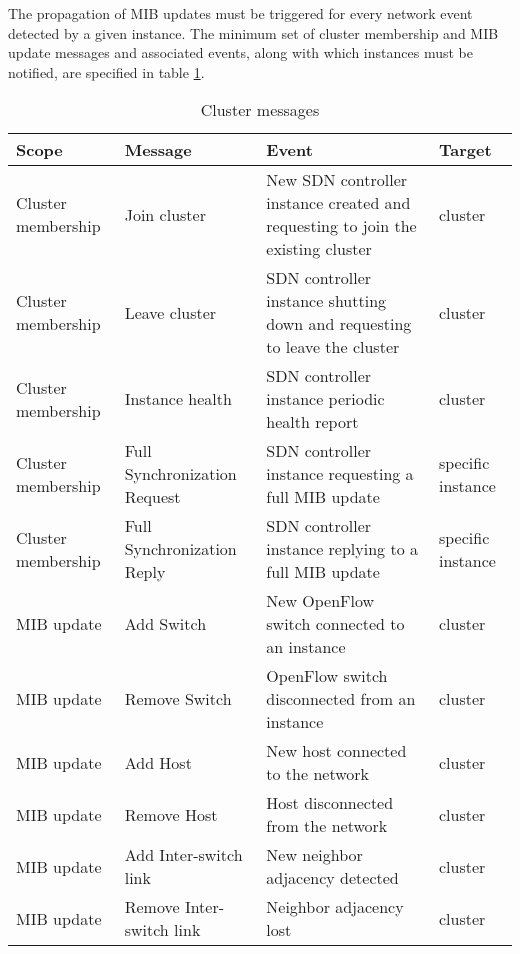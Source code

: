 The propagation of \gls{MIB} updates must be triggered for every network event detected by a given instance.
The minimum set of cluster membership and \gls{MIB} update messages and associated events, along with which instances must be notified, are specified in table \ref{table:cluster-message-spec}.
%
\begin{table}[h!]
	\begin{center}
		\begin{tabular}{ | l | p{} | p{6cm} | p{} | }
			\rowcolor{HeaderRowColor}
			\hline
			\textbf{Scope} & \textbf{Message} & \textbf{Event} & \textbf{Target}\\
			\hline
			Cluster membership & Join cluster & New \gls{SDN} controller instance created and requesting to join the existing cluster & cluster\\
			\hline
			Cluster membership & Leave cluster & \gls{SDN} controller instance shutting down and requesting to leave the cluster & cluster\\
			\hline
			Cluster membership & Instance health & \gls{SDN} controller instance periodic health report & cluster\\
			\hline
			Cluster membership & Full Synchronization Request & \gls{SDN} controller instance requesting a full \gls{MIB} update & specific instance\\
			\hline
			Cluster membership & Full Synchronization Reply & \gls{SDN} controller instance replying to a full \gls{MIB} update & specific instance\\
			\hline
			\gls{MIB} update & Add Switch & New OpenFlow switch connected to an instance & cluster\\
			\hline
			\gls{MIB} update & Remove Switch & OpenFlow switch disconnected from an instance & cluster\\
			\hline
			\gls{MIB} update & Add Host & New host connected to the network & cluster\\
			\hline
			\gls{MIB} update & Remove Host & Host disconnected from the network & cluster\\
			\hline
			\gls{MIB} update & Add Inter-switch link & New neighbor adjacency detected & cluster\\
			\hline
			\gls{MIB} update & Remove Inter-switch link & Neighbor adjacency lost & cluster\\
			\hline
		\end{tabular}
		\caption{Cluster messages}
		\label{table:cluster-message-spec}
	\end{center}
\end{table}
